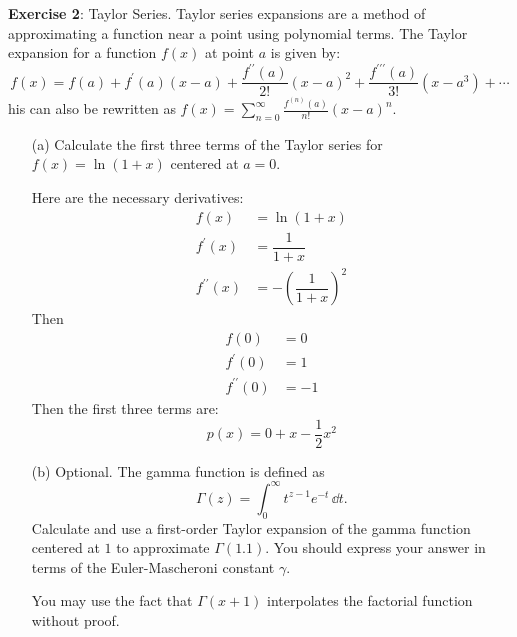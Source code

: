 \documentclass{article}
\begin{document}
    \textbf{Exercise 2}: Taylor Series. Taylor series expansions are a method of approximating a function near a point using polynomial terms. The Taylor expansion for a function $f(x)$ at point $a$ is given by:
        \begin{equation*}
            f(x) = f(a) + f^{\prime}(a)(x - a) + \dfrac{f^{\prime\prime}(a)}{2!}(x - a)^{2} + \dfrac{f^{\prime\prime\prime}(a)}{3!}(x - a^{3}) + \cdots
        \end{equation*}
    his can also be rewritten as $f(x) = \sum_{n = 0}^{\infty}\frac{f^{(n)}(a)}{n!}(x - a)^{n}$.
        \begin{itemize}
            \item [(a)] Calculate the first three terms of the Taylor series for $f(x) = \ln(1 + x)$ centered at $a = 0$.
                \begin{answer}
                    Here are the necessary derivatives:
                        \begin{align*}
                            f(x)                &= \ln(1 + x)                         \\
                            f^{\prime}(x)       &= \dfrac{1}{1 + x}                   \\
                            f^{\prime\prime}(x) &= -\left(\dfrac{1}{1 + x}\right)^{2}   
                        \end{align*}
                    Then 
                        \begin{align*}
                            f(0)                &= 0  \\
                            f^{\prime}(0)       &= 1  \\
                            f^{\prime\prime}(0) &= -1   
                        \end{align*}
                    Then the first three terms are:
                        \begin{equation*}
                            p(x) = 0 + x - \dfrac{1}{2}x^{2}
                        \end{equation*}
                \end{answer}

            \item [(b)] Optional. The gamma function is defined as 
                \begin{equation*}
                    \Gamma(z) = \int_{0}^{\infty} t^{z - 1}e^{-t} \, \dd{t}.
                \end{equation*}
            Calculate and use a first-order Taylor expansion of the gamma function centered at $1$ to approximate $\Gamma(1.1)$. You should express your answer in terms of the Euler-Mascheroni constant $\gamma$.

            You may use the fact that $\Gamma(x + 1)$ interpolates the factorial function without proof.
        \end{itemize}
\end{document}
